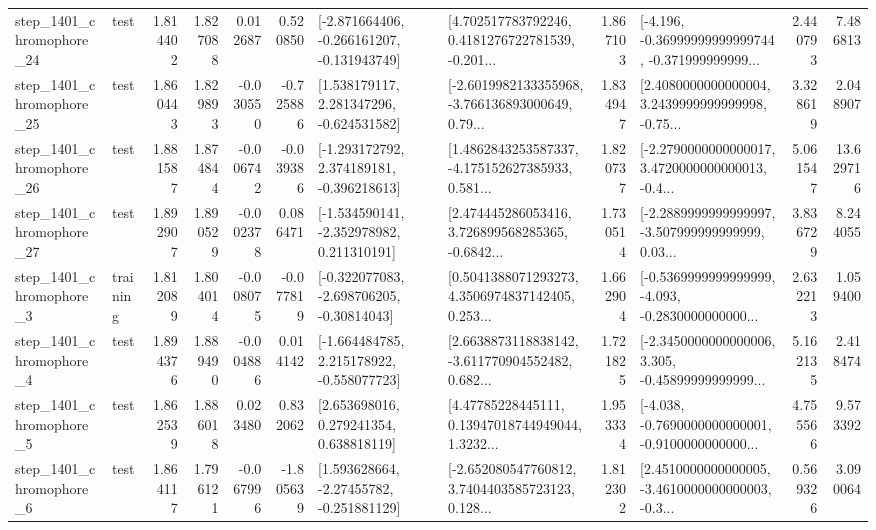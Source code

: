 \begin{tabular}{llrrrrllrlrr}
 step\_1401\_chromophore\_24 &      test &      1.814402 &    1.827088 &      0.012687 &  0.520850 &  [-2.871664406, -0.266161207, -0.131943749] &  [4.702517783792246, 0.4181276722781539, -0.201... &       1.867103 &  [-4.196, -0.36999999999999744, -0.371999999999... &            2.440793 &          7.486813 \\
 step\_1401\_chromophore\_25 &      test &      1.860443 &    1.829893 &     -0.030550 & -0.725886 &    [1.538179117, 2.281347296, -0.624531582] &  [-2.6019982133355968, -3.766136893000649, 0.79... &       1.834947 &  [2.4080000000000004, 3.2439999999999998, -0.75... &            3.328619 &          2.048907 \\
 step\_1401\_chromophore\_26 &      test &      1.881587 &    1.874844 &     -0.006742 & -0.039386 &   [-1.293172792, 2.374189181, -0.396218613] &  [1.4862843253587337, -4.175152627385933, 0.581... &       1.820737 &  [-2.2790000000000017, 3.4720000000000013, -0.4... &            5.061547 &         13.629716 \\
 step\_1401\_chromophore\_27 &      test &      1.892907 &    1.890529 &     -0.002378 &  0.086471 &   [-1.534590141, -2.352978982, 0.211310191] &  [2.474445286053416, 3.726899568285365, -0.6842... &       1.730514 &  [-2.2889999999999997, -3.507999999999999, 0.03... &            3.836729 &          8.244055 \\
  step\_1401\_chromophore\_3 &  training &      1.812089 &    1.804014 &     -0.008075 & -0.077819 &   [-0.322077083, -2.698706205, -0.30814043] &  [0.5041388071293273, 4.3506974837142405, 0.253... &       1.662904 &  [-0.5369999999999999, -4.093, -0.2830000000000... &            2.632213 &          1.059400 \\
  step\_1401\_chromophore\_4 &      test &      1.894376 &    1.889490 &     -0.004886 &  0.014142 &   [-1.664484785, 2.215178922, -0.558077723] &  [2.6638873118838142, -3.611770904552482, 0.682... &       1.721825 &  [-2.3450000000000006, 3.305, -0.45899999999999... &            5.162135 &          2.418474 \\
  step\_1401\_chromophore\_5 &      test &      1.862539 &    1.886018 &      0.023480 &  0.832062 &     [2.653698016, 0.279241354, 0.638818119] &  [4.47785228445111, 0.13947018744949044, 1.3232... &       1.953334 &  [-4.038, -0.7690000000000001, -0.9100000000000... &            4.755566 &          9.573392 \\
  step\_1401\_chromophore\_6 &      test &      1.864117 &    1.796121 &     -0.067996 & -1.805639 &    [1.593628664, -2.27455782, -0.251881129] &  [-2.652080547760812, 3.7404403585723123, 0.128... &       1.812302 &  [2.4510000000000005, -3.4610000000000003, -0.3... &            0.569326 &          3.090064 \\

\end{tabular}
